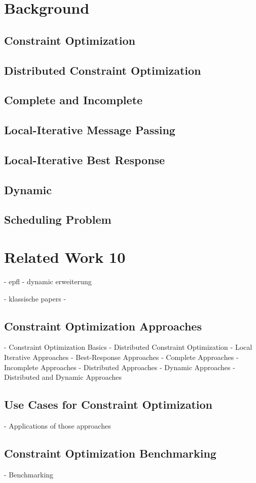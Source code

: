 \chapter{Background}
\section{Constraint Optimization}
\section{Distributed Constraint Optimization}
\section{Complete and Incomplete}
\section{Local-Iterative Message Passing}
\section{Local-Iterative Best Response}
\section{Dynamic}
\section{Scheduling Problem}

\chapter{Related Work 10}

- epfl
- dynamic erweiterung

- klassische papers
- 

\section{Constraint Optimization Approaches}
- Constraint Optimization Basics
- Distributed Constraint Optimization
- Local Iterative Approaches
- Best-Response Approaches
- Complete Approaches
- Incomplete Approaches
- Distributed Approaches
- Dynamic Approaches
- Distributed and  Dynamic Approaches
\section{Use Cases for Constraint Optimization}
- Applications of those approaches
\section{Constraint Optimization Benchmarking}
- Benchmarking